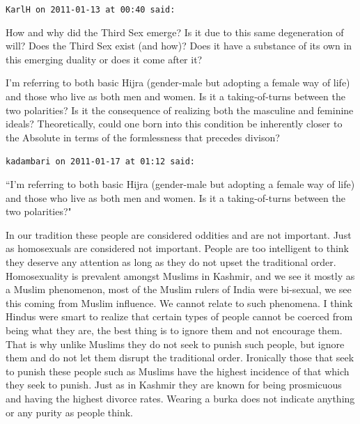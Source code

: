 \begin{footnotesize}\begin{sffamily}



\texttt{KarlH on 2011-01-13 at 00:40 said: }

How and why did the Third Sex emerge? Is it due to this same degeneration of will? Does the Third Sex exist (and how)? Does it have a substance of its own in this emerging duality or does it come after it?

I'm referring to both basic Hijra (gender-male but adopting a female way of life) and those who live as both men and women. Is it a taking-of-turns between the two polarities? Is it the consequence of realizing both the masculine and feminine ideals? Theoretically, could one born into this condition be inherently closer to the Absolute in terms of the formlessness that precedes divison?


\hfill

\texttt{kadambari on 2011-01-17 at 01:12 said: }

``I'm referring to both basic Hijra (gender-male but adopting a female way of life) and those who live as both men and women. Is it a taking-of-turns between the two polarities?"

In our tradition these people are considered oddities and are not important. Just as homosexuals are considered not important. People are too intelligent to think they deserve any attention as long as they do not upset the traditional order. Homosexuality is prevalent amongst Muslims in Kashmir, and we see it mostly as a Muslim phenomenon, most of the Muslim rulers of India were bi-sexual, we see this coming from Muslim influence. We cannot relate to such phenomena. I think Hindus were smart to realize that certain types of people cannot be coerced from being what they are, the best thing is to ignore them and not encourage them. That is why unlike Muslims they do not seek to punish such people, but ignore them and do not let them disrupt the traditional order. Ironically those that seek to punish these people such as Muslims have the highest incidence of that which they seek to punish. Just as in Kashmir they are known for being prosmicuous and having the highest divorce rates. Wearing a burka does not indicate anything or any purity as people think.


\end{sffamily}\end{footnotesize}
